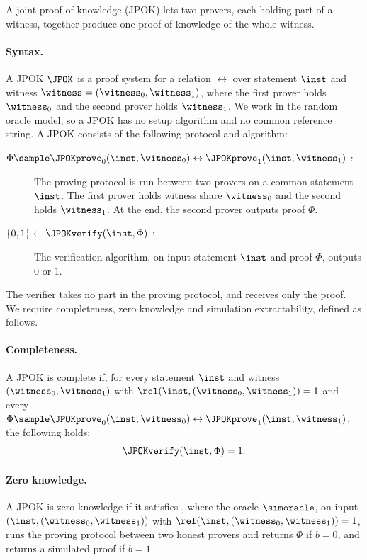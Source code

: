 A joint proof
of knowledge (JPOK) lets two provers, each holding part of a witness, together
produce one proof of knowledge of the whole witness.

\paragraph{Syntax.} A JPOK $\JPOK$ is a proof system for a relation $\rel$ over
statement $\inst$ and witness $\witness = (\witness_0, \witness_1)$, where the first
prover holds $\witness_0$ and the second prover holds $\witness_1$. We
work in the random oracle model, so a JPOK has no setup algorithm and no common
reference string. A JPOK consists of the
following protocol and algorithm:

  \begin{description}

    \item[$\Phi \sample \JPOKprove_0(\inst, \witness_0) \leftrightarrow
\JPOKprove_1(\inst, \witness_1)$ :] The proving protocol is run between two
provers on a common statement $\inst$. The first prover holds witness share
$\witness_0$ and the second holds $\witness_1$. At the end, the second prover
outputs proof $\Phi$.

    \item[$\{0,1\} \leftarrow \JPOKverify(\inst, \Phi)$ :] The
verification algorithm, on input statement $\inst$ and proof $\Phi$, outputs
$0$ or $1$.

  \end{description}

The verifier takes no part in the proving protocol, and receives only the proof.
We require completeness, zero knowledge and simulation extractability, defined
as follows.

\paragraph{Completeness.} A JPOK is complete if, for every statement $\inst$
and witness $(\witness_0, \witness_1)$ with $\rel(\inst, (\witness_0,
\witness_1)) = 1$ and every $\Phi \sample \JPOKprove_0(\inst, \witness_0)
\leftrightarrow \JPOKprove_1(\inst, \witness_1)$, the following holds:
%
\begin{equation*}
%
  \JPOKverify(\inst, \Phi) = 1.
%
\end{equation*}

\paragraph{Zero knowledge.} A JPOK is zero knowledge if it satisfies
, where the oracle $\simoracle$, on input $(\inst, (\witness_0,
\witness_1))$ with $\rel(\inst, (\witness_0, \witness_1)) = 1$, runs the
proving protocol between two honest provers and returns $\Phi$ if $b = 0$, and
returns a simulated proof if $b = 1$.


